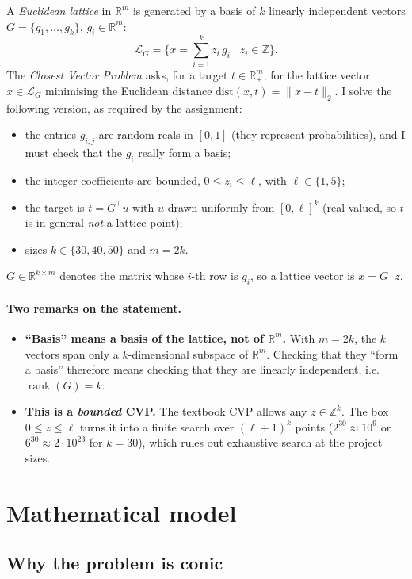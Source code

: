 \documentclass[11pt,a4paper]{article}
\newcommand{\R}{\mathbb{R}}
\newcommand{\Z}{\mathbb{Z}}
\newcommand{\norm}[1]{\lVert #1\rVert_2}
\begin{document}
A \emph{Euclidean lattice} in $\R^m$ is generated by a basis of $k$ linearly independent vectors $G=\{g_1,\dots,g_k\}$, $g_i\in\R^m$:
\[
  \mathcal{L}_G=\Big\{x=\sum_{i=1}^k z_i\,g_i \;\Big|\; z_i\in\Z\Big\}.
\]
The \emph{Closest Vector Problem} asks, for a target $t\in\R^m_+$, for the lattice vector $x\in\mathcal{L}_G$ minimising the Euclidean distance $\mathrm{dist}(x,t)=\norm{x-t}$. I solve the following version, as required by the assignment:
\begin{itemize}
  \item the entries $g_{i,j}$ are random reals in $[0,1]$ (they represent probabilities), and I must check that the $g_i$ really form a basis;
  \item the integer coefficients are bounded, $0\le z_i\le \ell$, with $\ell\in\{1,5\}$;
  \item the target is $t=G^\top u$ with $u$ drawn uniformly from $[0,\ell]^k$ (real valued, so $t$ is in general \emph{not} a lattice point);
  \item sizes $k\in\{30,40,50\}$ and $m=2k$.
\end{itemize}
$G\in\R^{k\times m}$ denotes the matrix whose $i$-th row is $g_i$, so a lattice vector is $x=G^\top z$.

\paragraph{Two remarks on the statement.}
\begin{itemize}
  \item \textbf{``Basis'' means a basis of the lattice, not of $\R^m$.} With $m=2k$, the $k$ vectors span only a $k$-dimensional subspace of $\R^m$. Checking that they ``form a basis'' therefore means checking that they are linearly independent, i.e.\ $\operatorname{rank}(G)=k$.
  \item \textbf{This is a \emph{bounded} CVP.} The textbook CVP allows any $z\in\Z^k$. The box $0\le z\le\ell$ turns it into a finite search over $(\ell+1)^k$ points ($2^{30}\approx10^9$ or $6^{30}\approx2\cdot10^{23}$ for $k=30$), which rules out exhaustive search at the project sizes.
\end{itemize}

\section{Mathematical model}

\subsection{Why the problem is conic}
\end{document}

